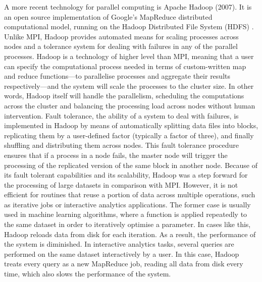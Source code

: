 

A more recent technology for parallel computing is Apache Hadoop (2007). It is an open source implementation of Google's MapReduce \autocite{dean08mapreduce} distributed computational model, running on the Hadoop Distributed File System (HDFS) \autocite{shvackho10hadoop}. 
Unlike MPI, Hadoop provides automated means for scaling processes across nodes and a tolerance system for dealing with failures in any of the parallel processes. 
Hadoop is a technology of higher level than MPI, meaning that a user can specify the computational process needed in terms of custom-written map and reduce functions---to parallelise processes and aggregate their results respectively---and the system will scale the processes to the cluster size. 
In other words, Hadoop itself will handle the parallelism, scheduling the computations across the cluster and balancing the processing load across nodes without human intervention. 
Fault tolerance, the ability of a system to deal with failures, is implemented in Hadoop by means of automatically splitting data files into blocks, replicating them by a user-defined factor (typically a factor of three), and finally shuffling and distributing them across nodes. 
This fault tolerance procedure ensures that if a process in a node fails, the master node will trigger the processing of the replicated version of the same block in another node. 
Because of its fault tolerant capabilities and its scalability, Hadoop was a step forward for the processing of large datasets in comparison with MPI. 
However, it is not efficient for routines that reuse a portion of data across multiple operations, such as iterative jobs or interactive analytics applications.
The former case is usually used in machine learning algorithms, where a function is applied repeatedly to the same dataset in order to iteratively optimise a parameter. 
In cases like this, Hadoop reloads data from disk for each iteration. As a result, the performance of the system is diminished.
In interactive analytics tasks, several queries are performed on the same dataset interactively by a user. In this case, Hadoop treats every query as a new MapReduce job, reading all data from disk every time, which also slows the performance of the system.

